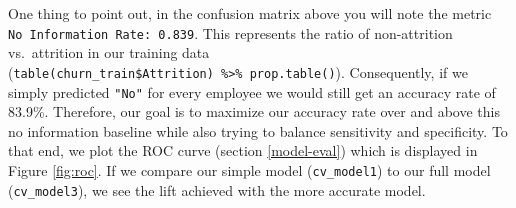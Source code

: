 \documentclass[]{krantz}
\makeatletter
\newenvironment{Shaded}{\begin{snugshade}}{\end{snugshade}}
\newcommand{\CommentTok}[1]{\textcolor[rgb]{0.37,0.37,0.37}{\textit{#1}}}
\newcommand{\DataTypeTok}[1]{\textcolor[rgb]{0.27,0.27,0.27}{#1}}
\newcommand{\DecValTok}[1]{\textcolor[rgb]{0.06,0.06,0.06}{#1}}
\newcommand{\FloatTok}[1]{\textcolor[rgb]{0.06,0.06,0.06}{#1}}
\newcommand{\KeywordTok}[1]{\textcolor[rgb]{0.27,0.27,0.27}{\textbf{#1}}}
\newcommand{\NormalTok}[1]{#1}
\newcommand{\OperatorTok}[1]{\textcolor[rgb]{0.43,0.43,0.43}{\textbf{#1}}}
\newcommand{\OtherTok}[1]{\textcolor[rgb]{0.37,0.37,0.37}{#1}}
\newcommand{\StringTok}[1]{\textcolor[rgb]{0.5,0.5,0.5}{#1}}
\newenvironment{kframe}{%
\medskip{}
\setlength{\fboxsep}{.8em}
 \def\at@end@of@kframe{}%
 \ifinner\ifhmode%
  \def\at@end@of@kframe{\end{minipage}}%
  \begin{minipage}{\columnwidth}%
 \fi\fi%
 \def\FrameCommand##1{\hskip\@totalleftmargin \hskip-\fboxsep
 \colorbox{shadecolor}{##1}\hskip-\fboxsep
     \hskip-\linewidth \hskip-\@totalleftmargin \hskip\columnwidth}%
 \MakeFramed {\advance\hsize-\width
   \@totalleftmargin\z@ \linewidth\hsize
   \@setminipage}}%
 {\par\unskip\endMakeFramed%
 \at@end@of@kframe}
\renewenvironment{Shaded}{\begin{kframe}}{\end{kframe}}
\makeatother
\begin{document}
One thing to point out, in the confusion matrix above you will note the metric \texttt{No\ Information\ Rate:\ 0.839}. This represents the ratio of non-attrition vs.~attrition in our training data (\texttt{table(churn\_train\$Attrition)\ \%\textgreater{}\%\ prop.table()}). Consequently, if we simply predicted \texttt{"No"} for every employee we would still get an accuracy rate of 83.9\%. Therefore, our goal is to maximize our accuracy rate over and above this no information baseline while also trying to balance sensitivity and specificity. To that end, we plot the ROC curve (section \ref{model-eval}) which is displayed in Figure \ref{fig:roc}. If we compare our simple model (\texttt{cv\_model1}) to our full model (\texttt{cv\_model3}), we see the lift achieved with the more accurate model.

\begin{Shaded}
\end{Shaded}
\end{document}
